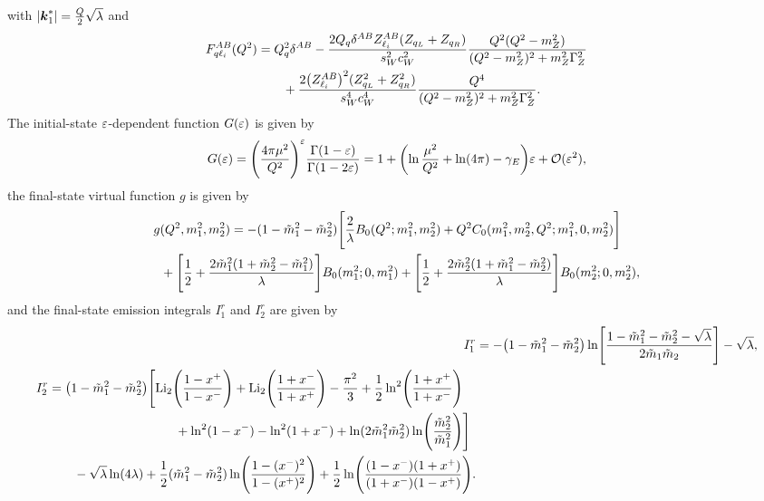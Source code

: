 with $\lvert\boldsymbol{k}_1^*\rvert = \frac{Q}{2}\sqrt{\lambda}$ and
\begin{equation}
\begin{split}
    F_{q\ell_i}^{AB}(Q^2) &= Q_q^2\delta^{AB}
    - \frac{2Q_q\delta^{AB}Z_{\ell_i}^{AB}(Z_{q_L}+Z_{q_R})}{s_W^2c_W^2}\frac{Q^2(Q^2-m_Z^2)}{(Q^2-m_Z^2)^2+m_Z^2\Gamma_Z^2}
    \\ &\qquad
    + \frac{2\bigl(Z_{\ell_i}^{AB}\bigr)^2(Z_{q_L}^2+Z_{q_R}^2)}{s_W^4c_W^4}\frac{Q^4}{(Q^2-m_Z^2)^2+m_Z^2\Gamma_Z^2}.
\end{split}
\end{equation}
The initial-state $\varepsilon$-dependent function $G(\varepsilon)$ is given by
\begin{equation}
    G(\varepsilon) = \Biggl( \frac{4\pi\mu^2}{Q^2} \Biggr)^\varepsilon \frac{\Gamma(1-\varepsilon)}{\Gamma(1-2\varepsilon)}
    = 1 + \biggl( \ln\frac{\mu^2}{Q^2} + \ln(4\pi)-\gamma_E \biggr) \varepsilon + \mathcal{O}(\varepsilon^2),
\label{eq:summary_G_eps}
\end{equation}
the final-state virtual function $g$ is given by
\begin{equation}
\begin{split}
    & g(Q^2,m_1^2,m_2^2) =
    - (1-\tilde{m}_1^2-\tilde{m}_2^2) \Biggl[
        \frac{2}{\lambda} B_0(Q^2;m_1^2,m_2^2)
        + Q^2 C_0(m_1^2,m_2^2,Q^2;m_1^2,0,m_2^2)
    \Biggr]
    \\ &\;\;
    + \Biggl[
        \frac{1}{2}
        + \frac{2\tilde{m}_1^2(1+\tilde{m}_2^2-\tilde{m}_1^2)}{\lambda}
    \Biggr] B_0(m_1^2;0,m_1^2)
    + \Biggl[
        \frac{1}{2}
        + \frac{2\tilde{m}_2^2(1+\tilde{m}_1^2-\tilde{m}_2^2)}{\lambda}
    \Biggr] B_0(m_2^2;0,m_2^2),
\end{split}
\label{eq:summary_g}
\end{equation}
and the final-state emission integrals $I^r_1$ and $I^r_2$ are given by
\begin{align}
    I^r_1 &= -\bigl( 1-\mt_1^2-\mt_2^2 \bigr) \ln\Biggl[
        \frac{1-\mt_1^2-\mt_2^2-\sqrt{\lambda}}{2\mt_1\mt_2}
    \Biggr] - \sqrt{\lambda},
    \label{eq:summary_Ir1}
    \\
    \begin{split}
        I^r_2 &=
        \bigl( 1-\mt_1^2-\mt_2^2 \bigr) \Biggl[
            \Litwo\Biggl( \frac{1-\xp}{1-\xm} \Biggr)
            + \Litwo\Biggl( \frac{1+\xm}{1+\xp} \Biggr)
            - \frac{\pi^2}{3}
            + \frac{1}{2}\ln^2\Biggl( \frac{1+\xp}{1+\xm} \Biggr)
            \\ &\hspace{10em}
            + \ln^2(1-\xm) - \ln^2(1+\xm)
            + \ln(2\mt_1^2\mt_2^2) \ln\Biggl( \frac{\mt_2^2}{\mt_1^2} \Biggr)
        \Biggr]
        \\ &\qquad
        - \sqrt{\lambda}\ln(4\lambda)
        + \frac{1}{2}(\mt_1^2-\mt_2^2) \ln\Biggl( \frac{1-(\xm)^2}{1-(\xp)^2} \Biggr)
        + \frac{1}{2} \ln\Biggl( \frac{(1-\xm)(1+\xp)}{(1+\xm)(1-\xp)} \Biggr).
    \end{split}
    \label{eq:summary_Ir2}
\end{align}
